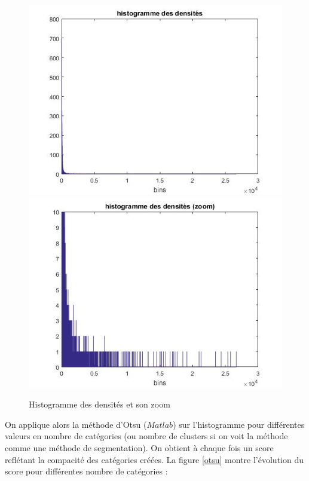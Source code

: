 \documentclass{book}
\begin{document}
\begin{figure}[H]
\begin{center}
\includegraphics[scale=0.5]{images/densite_histo.jpg}
\includegraphics[scale=0.5]{images/densite_histo_zoom.jpg}
\end{center}
\caption{Histogramme des densités et son zoom}
\label{densite_histo}
\end{figure}
\clearpage

On applique alors la méthode d'Otsu ($Matlab$) sur l'histogramme pour différentes valeurs en nombre de catégories (ou nombre de clusters si on voit la méthode comme
une méthode de segmentation). On obtient à chaque fois un score reflétant la compacité des catégories créées. La figure \ref{otsu} montre l'évolution du score
pour différentes nombre de catégories :
\end{document}

